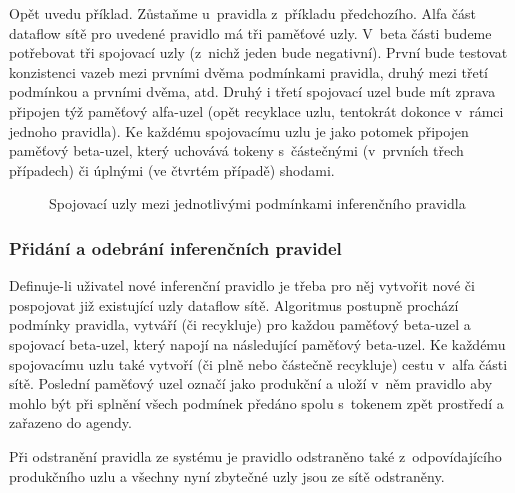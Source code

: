 Opět uvedu příklad. Zůstaňme u~pravidla z~příkladu předchozího. Alfa část
dataflow sítě pro uvedené pravidlo má tři paměťové uzly. V~beta části
budeme potřebovat tři spojovací uzly (z~nichž jeden bude negativní).
První bude testovat konzistenci vazeb mezi prvními dvěma podmínkami
pravidla, druhý mezi třetí podmínkou a prvními dvěma, atd. Druhý i třetí
spojovací uzel bude mít zprava připojen týž paměťový alfa-uzel (opět
recyklace uzlu, tentokrát dokonce v~rámci jednoho pravidla). Ke každému
spojovacímu uzlu je jako potomek připojen paměťový beta-uzel, který
uchovává tokeny s~částečnými (v~prvních třech případech) či úplnými
(ve čtvrtém případě) shodami.

\begin{figure}[h]
\centerline{}
\caption{Spojovací uzly mezi jednotlivými podmínkami inferenčního pravidla\cite{doorenbos}}
\label{condition-joining}
\end{figure}
\subsubsection{Přidání a odebrání inferenčních pravidel}
Definuje-li uživatel nové inferenční pravidlo je třeba pro něj vytvořit
nové či pospojovat již existující uzly dataflow sítě. Algoritmus postupně
prochází podmínky pravidla, vytváří (či recykluje) pro každou paměťový
beta-uzel a spojovací beta-uzel, který napojí na následující paměťový beta-uzel.
Ke každému spojovacímu uzlu také vytvoří (či plně nebo částečně recykluje)
cestu v~alfa části sítě. Poslední paměťový uzel označí jako produkční
a uloží v~něm pravidlo aby mohlo být při splnění všech podmínek předáno
spolu s~tokenem zpět prostředí a zařazeno do agendy.

Při odstranění pravidla ze systému je pravidlo odstraněno také z~odpovídajícího
produkčního uzlu a všechny nyní zbytečné uzly jsou ze sítě odstraněny.
